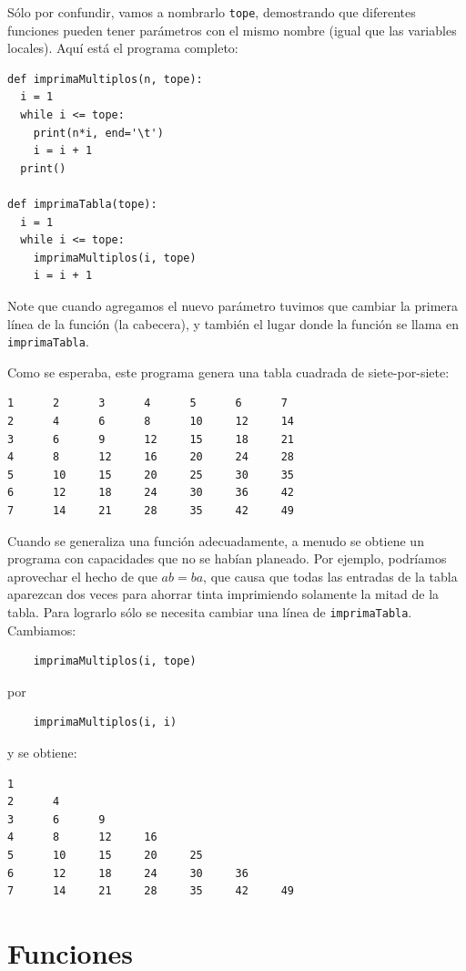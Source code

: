 Sólo por confundir, vamos a nombrarlo \texttt{tope}, demostrando que
diferentes funciones pueden tener parámetros con el mismo nombre (igual
que las variables locales). Aquí está el programa completo:
\begin{verbatim}
def imprimaMultiplos(n, tope):
  i = 1
  while i <= tope:
    print(n*i, end='\t')
    i = i + 1
  print()

def imprimaTabla(tope):
  i = 1
  while i <= tope:
    imprimaMultiplos(i, tope)
    i = i + 1
\end{verbatim}

Note que cuando agregamos el nuevo parámetro tuvimos que cambiar la
primera línea de la función (la cabecera), y también el lugar donde
la función se llama en \texttt{imprimaTabla}.

Como se esperaba, este programa genera una tabla cuadrada de siete-por-siete:
\begin{verbatim}
1      2      3      4      5      6      7
2      4      6      8      10     12     14
3      6      9      12     15     18     21
4      8      12     16     20     24     28
5      10     15     20     25     30     35
6      12     18     24     30     36     42
7      14     21     28     35     42     49
\end{verbatim}
Cuando se generaliza una función adecuadamente, a menudo se obtiene
un programa con capacidades que no se habían planeado. Por ejemplo,
podríamos aprovechar el hecho de que $ab=ba$, que causa que todas
las entradas de la tabla aparezcan dos veces para ahorrar tinta imprimiendo
solamente la mitad de la tabla. Para lograrlo sólo se necesita cambiar
una línea de \texttt{imprimaTabla}. Cambiamos:
\begin{verbatim}
    imprimaMultiplos(i, tope)
\end{verbatim}
por
\begin{verbatim}
    imprimaMultiplos(i, i)
\end{verbatim}
y se obtiene:
\begin{verbatim}
1
2      4
3      6      9
4      8      12     16
5      10     15     20     25
6      12     18     24     30     36
7      14     21     28     35     42     49
\end{verbatim}

\section{Funciones}


